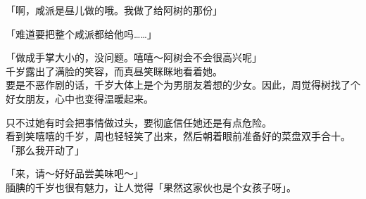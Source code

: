 「啊，咸派是昼儿做的哦。我做了给阿树的那份」

「难道要把整个咸派都给他吗……」

「做成手掌大小的，没问题。嘻嘻～阿树会不会很高兴呢」\\

千岁露出了满脸的笑容，而真昼笑眯眯地看着她。\\

要是不恶作剧的话，千岁大体上是个为男朋友着想的少女。因此，周觉得树找了个好女朋友，心中也变得温暖起来。

只不过她有时会把事情做过头，要彻底信任她还是有点危险。\\

看到笑嘻嘻的千岁，周也轻轻笑了出来，然后朝着眼前准备好的菜盘双手合十。\\

「那么我开动了」

「来，请～好好品尝美味吧～」\\

腼腆的千岁也很有魅力，让人觉得「果然这家伙也是个女孩子呀」。
